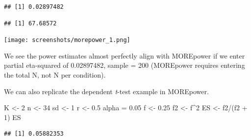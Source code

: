 \documentclass[
]{book}
\newenvironment{Shaded}{\begin{snugshade}}{\end{snugshade}}
\newcommand{\DecValTok}[1]{\textcolor[rgb]{0.00,0.00,0.81}{#1}}
\newcommand{\FloatTok}[1]{\textcolor[rgb]{0.00,0.00,0.81}{#1}}
\newcommand{\NormalTok}[1]{#1}
\newcommand{\OtherTok}[1]{\textcolor[rgb]{0.56,0.35,0.01}{#1}}
\newcommand{\SpecialCharTok}[1]{\textcolor[rgb]{0.00,0.00,0.00}{#1}}
\begin{document}
\begin{Shaded}
\end{Shaded}

\begin{verbatim}
## [1] 0.02897482
\end{verbatim}

\begin{Shaded}
\end{Shaded}

\begin{verbatim}
## [1] 67.68572
\end{verbatim}

\texttt{[image: screenshots/morepower\_1.png]}

We see the power estimates almost perfectly align with MOREpower if we enter partial eta-squared of 0.02897482, sample = 200 (MOREpower requires entering the total N, not N per condition).

We can also replicate the dependent \emph{t}-test example in MOREpower.

\begin{Shaded}
\begin{Highlighting}[]
\NormalTok{K }\OtherTok{\textless{}{-}} \DecValTok{2}
\NormalTok{n }\OtherTok{\textless{}{-}} \DecValTok{34}
\NormalTok{sd }\OtherTok{\textless{}{-}} \DecValTok{1}
\NormalTok{r }\OtherTok{\textless{}{-}} \FloatTok{0.5}
\NormalTok{alpha }\OtherTok{=} \FloatTok{0.05}
\NormalTok{f }\OtherTok{\textless{}{-}} \FloatTok{0.25}
\NormalTok{f2 }\OtherTok{\textless{}{-}}\NormalTok{ f}\SpecialCharTok{\^{}}\DecValTok{2}
\NormalTok{ES }\OtherTok{\textless{}{-}}\NormalTok{ f2}\SpecialCharTok{/}\NormalTok{(f2 }\SpecialCharTok{+} \DecValTok{1}\NormalTok{)}
\NormalTok{ES}
\end{Highlighting}
\end{Shaded}

\begin{verbatim}
## [1] 0.05882353
\end{verbatim}
\end{document}
